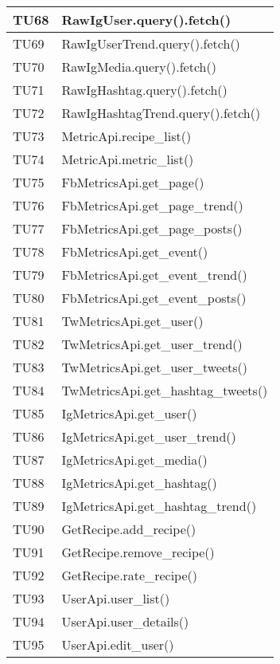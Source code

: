 \begin{center}
\begin{longtable}{| p{3cm} | p{9.5cm} |}
					\hline
					TU68 & RawIgUser.query().fetch() \\
					\hline
					TU69 & RawIgUserTrend.query().fetch() \\
					\hline
					TU70 & RawIgMedia.query().fetch() \\
					\hline
					TU71 & RawIgHashtag.query().fetch() \\
					\hline
					TU72 & RawIgHashtagTrend.query().fetch() \\
					\hline
					TU73 & MetricApi.recipe\_list() \\
					\hline
					TU74 & MetricApi.metric\_list() \\
					\hline
					TU75 & FbMetricsApi.get\_page() \\
					\hline
					TU76 & FbMetricsApi.get\_page\_trend() \\
					\hline
					TU77 & FbMetricsApi.get\_page\_posts() \\
					\hline
					TU78 & FbMetricsApi.get\_event() \\
					\hline
					TU79 & FbMetricsApi.get\_event\_trend() \\
					\hline
					TU80 & FbMetricsApi.get\_event\_posts() \\
					\hline
					TU81 & TwMetricsApi.get\_user() \\
					\hline
					TU82 & TwMetricsApi.get\_user\_trend() \\
					\hline
					TU83 & TwMetricsApi.get\_user\_tweets() \\
					\hline
					TU84 & TwMetricsApi.get\_hashtag\_tweets() \\
					\hline
					TU85 & IgMetricsApi.get\_user() \\
					\hline
					TU86 & IgMetricsApi.get\_user\_trend() \\
					\hline
					TU87 & IgMetricsApi.get\_media() \\
					\hline
					TU88 & IgMetricsApi.get\_hashtag() \\
					\hline
					TU89 & IgMetricsApi.get\_hashtag\_trend() \\
					\hline
					TU90 & GetRecipe.add\_recipe() \\
					\hline
					TU91 & GetRecipe.remove\_recipe() \\
					\hline
					TU92 & GetRecipe.rate\_recipe() \\
					\hline
					TU93 & UserApi.user\_list() \\
					\hline
					TU94 & UserApi.user\_details() \\
					\hline
					TU95 & UserApi.edit\_user() \\

\end{longtable}
\end{center}

